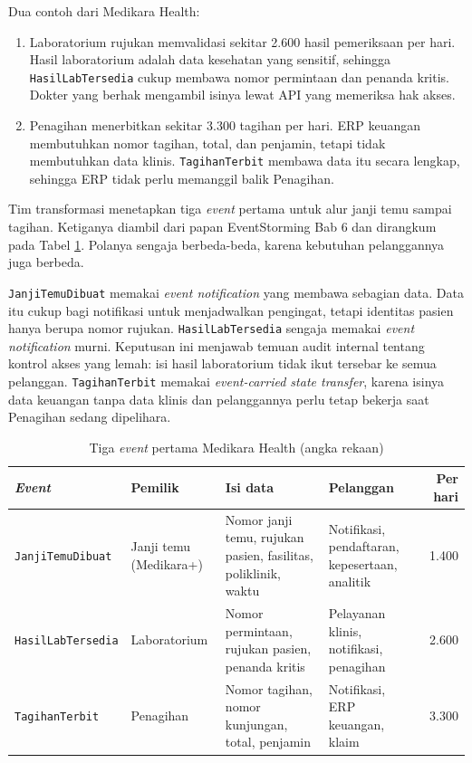 Dua contoh dari Medikara Health:
\begin{enumerate}
  \item Laboratorium rujukan memvalidasi sekitar 2.600 hasil pemeriksaan per hari. Hasil
        laboratorium adalah data kesehatan yang sensitif, sehingga \texttt{HasilLabTersedia}
        cukup membawa nomor permintaan dan penanda kritis. Dokter yang berhak mengambil isinya lewat
        API yang memeriksa hak akses.
  \item Penagihan menerbitkan sekitar 3.300 tagihan per hari. ERP keuangan membutuhkan nomor
        tagihan, total, dan penjamin, tetapi tidak membutuhkan data klinis. \texttt{TagihanTerbit}
        membawa data itu secara lengkap, sehingga ERP tidak perlu memanggil balik Penagihan.
\end{enumerate}

\begin{kasus}[title={Kasus Medikara Health: Tiga Event Pertama}]
  Tim transformasi menetapkan tiga \textit{event} pertama untuk alur janji temu sampai tagihan.
  Ketiganya diambil dari papan EventStorming Bab 6 dan dirangkum pada Tabel
  \ref{tab:ch09-event-medikara}. Polanya sengaja berbeda-beda, karena kebutuhan pelanggannya juga
  berbeda.

  \texttt{JanjiTemuDibuat} memakai \textit{event notification} yang membawa sebagian data. Data itu
  cukup bagi notifikasi untuk menjadwalkan pengingat, tetapi identitas pasien hanya berupa nomor
  rujukan. \texttt{HasilLabTersedia} sengaja memakai \textit{event notification} murni. Keputusan
  ini menjawab temuan audit internal tentang kontrol akses yang lemah: isi hasil laboratorium tidak
  ikut tersebar ke semua pelanggan. \texttt{TagihanTerbit} memakai \textit{event-carried state
  transfer}, karena isinya data keuangan tanpa data klinis dan pelanggannya perlu tetap bekerja
  saat Penagihan sedang dipelihara.
\end{kasus}

\begin{table}[!htb]
  \centering
  \caption{Tiga \textit{event} pertama Medikara Health (angka rekaan)}
  \label{tab:ch09-event-medikara}
  \footnotesize
  \begin{tabularx}{\textwidth}{>{\raggedright\arraybackslash}p{2.3cm} >{\raggedright\arraybackslash}p{1.8cm} >{\raggedright\arraybackslash}X >{\raggedright\arraybackslash}X r}
    \hline
    \textbf{\textit{Event}} & \textbf{Pemilik} & \textbf{Isi data} & \textbf{Pelanggan} &
      \textbf{Per hari} \\ \hline
    \texttt{JanjiTemu\-Dibuat} & Janji temu (Medikara+) & Nomor janji temu, rujukan pasien,
      fasilitas, poliklinik, waktu & Notifikasi, pendaftaran, kepesertaan, analitik & 1.400 \\
      \hline
    \texttt{HasilLab\-Tersedia} & Laboratorium & Nomor permintaan, rujukan pasien, penanda kritis &
      Pelayanan klinis, notifikasi, penagihan & 2.600 \\ \hline
    \texttt{Tagihan\-Terbit} & Penagihan & Nomor tagihan, nomor kunjungan, total, penjamin &
      Notifikasi, ERP keuangan, klaim & 3.300 \\ \hline
  \end{tabularx}
\end{table}

